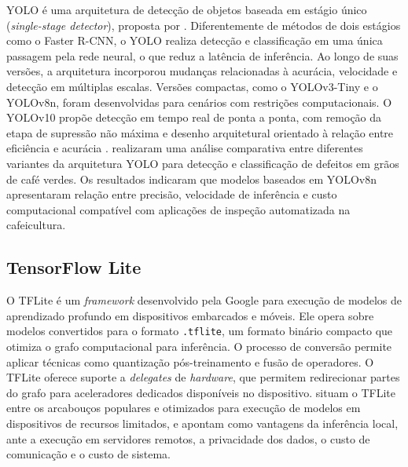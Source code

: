 \documentclass[artigo,times,capa]{iftex2024}
\begin{document}
\ac{YOLO} é uma arquitetura de detecção de objetos baseada em estágio único (\textit{single-stage detector}), proposta por \textcite{Redmon2016YOLO}. Diferentemente de métodos de dois estágios como o Faster R-CNN, o \ac{YOLO} realiza detecção e classificação em uma única passagem pela rede neural, o que reduz a latência de inferência. Ao longo de suas versões, a arquitetura incorporou mudanças relacionadas à acurácia, velocidade e detecção em múltiplas escalas. Versões compactas, como o YOLOv3-Tiny e o YOLOv8n, foram desenvolvidas para cenários com restrições computacionais. O YOLOv10 propõe detecção em tempo real de ponta a ponta, com remoção da etapa de supressão não máxima e desenho arquitetural orientado à relação entre eficiência e acurácia \cite{Wang2024YOLOv10}. \textcite{Gope2024Comparative} realizaram uma análise comparativa entre diferentes variantes da arquitetura YOLO para detecção e classificação de defeitos em grãos de café verdes. Os resultados indicaram que modelos baseados em YOLOv8n apresentaram relação entre precisão, velocidade de inferência e custo computacional compatível com aplicações de inspeção automatizada na cafeicultura.
 
\subsection{TensorFlow Lite}
 
O \ac{TFLite} é um \textit{framework} desenvolvido pela Google para execução de modelos de aprendizado profundo em dispositivos embarcados e móveis. Ele opera sobre modelos convertidos para o formato \texttt{.tflite}, um formato binário compacto que otimiza o grafo computacional para inferência. O processo de conversão permite aplicar técnicas como quantização pós-treinamento e fusão de operadores. O \ac{TFLite} oferece suporte a \textit{delegates} de \textit{hardware}, que permitem redirecionar partes do grafo para aceleradores dedicados disponíveis no dispositivo. \textcite{Zhao2022A} situam o \ac{TFLite} entre os arcabouços populares e otimizados para execução de modelos em dispositivos de recursos limitados, e apontam como vantagens da inferência local, ante a execução em servidores remotos, a privacidade dos dados, o custo de comunicação e o custo de sistema.
 
\end{document}
